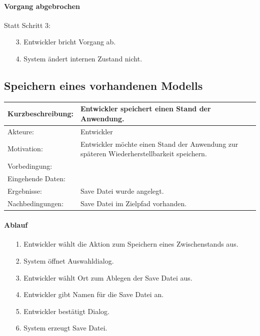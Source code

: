 \paragraph{Vorgang abgebrochen}
Statt Schritt 3:
\begin{itemize}[itemsep=0pt]
\item[3.] Entwickler bricht Vorgang ab. 
\item[4.] System ändert internen Zustand nicht. 
\end{itemize}

\subsection{Speichern eines vorhandenen Modells}
\label{sec:save}

\begin{tabular}[h]{|p{4cm}|p{}|}
\hline 
\rule[-1ex]{0pt}{2.5ex}Kurzbeschreibung: & 
Entwickler speichert einen Stand der Anwendung. \\  
\hline 
\rule[-1ex]{0pt}{2.5ex}Akteure: & 
Entwickler \\ 
\hline 
\rule[-1ex]{0pt}{2.5ex}Motivation: & 
Entwickler möchte einen Stand der Anwendung zur späteren Wiederherstellbarkeit speichern. \\ 
\hline 
\rule[-1ex]{0pt}{2.5ex}Vorbedingung: &  \\ 
\hline 
\rule[-1ex]{0pt}{2.5ex}Eingehende Daten: & \\ 
\hline 
\rule[-1ex]{0pt}{2.5ex}Ergebnisse: & Save Datei wurde angelegt. \\ 
\hline 
\rule[-1ex]{0pt}{2.5ex}Nachbedingungen: & Save Datei im Zielpfad vorhanden.  \\ 
\hline 
\end{tabular} 

\paragraph{Ablauf}

\begin{itemize}[itemsep=0pt]
\item[1.] Entwickler wählt die Aktion zum Speichern eines Zwischenstands aus.
\item[2.] System öffnet Auswahldialog. 
\item[3.] Entwickler wählt Ort zum Ablegen der Save Datei aus.
\item[4.] Entwickler gibt Namen für die Save Datei an.
\item[5.] Entwickler bestätigt Dialog.
\item[6.] System erzeugt Save Datei.
\end{itemize}


